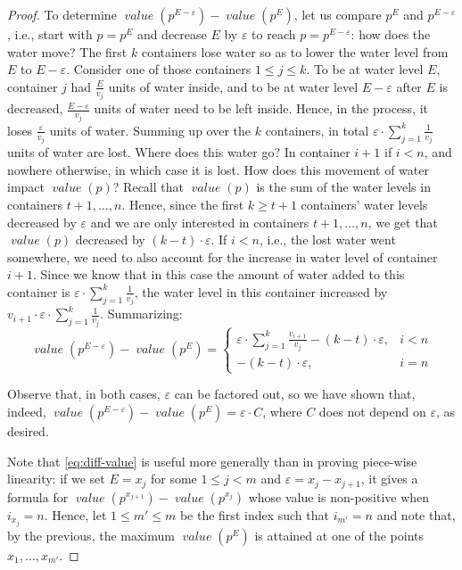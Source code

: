 \documentclass[sigconf,nonacm]{aamas}
\DeclareMathOperator{\valueText}{\textit{value}}
\newcommand{\val}[1]{\valueText({#1})}
\begin{document}
\begin{proof}
To determine $\val{p^{E - \varepsilon}} - \val{p^E}$, let us compare $p^E$ and $p^{E - \varepsilon}$, i.e., start with $p = p^E$ and decrease $E$ by $\varepsilon$ to reach $p = p^{E - \varepsilon}$: how does the water move? The first $k$ containers lose water so as to lower the water level from $E$ to $E - \varepsilon$. Consider one of those containers $1 \leq j \leq k$. To be at water level $E$, container $j$ had $\frac{E}{v_j}$ units of water inside, and to be at water level $E - \varepsilon$ after $E$ is decreased, $\frac{E - \varepsilon}{v_j}$ units of water need to be left inside. Hence, in the process, it loses $\frac{\varepsilon}{v_j}$ units of water. Summing up over the $k$ containers, in total $\varepsilon \cdot \sum_{j = 1}^{k}\frac{1}{v_j}$ units of water are lost. Where does this water go? In container $i + 1$ if $i < n$, and nowhere otherwise, in which case it is lost. How does this movement of water impact $\val{p}$? Recall that $\val{p}$ is the sum of the water levels in containers $t + 1, \dots, n$. Hence, since the first $k \geq t + 1$ containers' water levels decreased by $\varepsilon$ and we are only interested in containers $t + 1, \dots, n$, we get that $\val{p}$ decreased by $(k - t) \cdot \varepsilon$. If $i < n$, i.e., the lost water went somewhere, we need to also account for the increase in water level of container $i + 1$. Since we know that in this case the amount of water added to this container is $\varepsilon\cdot\sum_{j = 1}^{k}\frac{1}{v_j}$, the water level in this container increased by $v_{i + 1} \cdot \varepsilon \cdot \sum_{j = 1}^{k}\frac{1}{v_j}$. Summarizing:%
%
\begin{equation}\label{eq:diff-value}
    \val{p^{E - \varepsilon}} - \val{p^E} = \left\{
    \begin{array}{ll}
           \varepsilon \cdot \sum_{j = 1}^{k}\frac{v_{i + 1}}{v_j} - (k - t) \cdot \varepsilon, & i < n \\
           - (k - t) \cdot \varepsilon, & i = n 
    \end{array}
    \right.
\end{equation}

Observe that, in both cases, $\varepsilon$ can be factored out, so we have shown that, indeed, $\val{p^{E - \varepsilon}} - \val{p^E} = \varepsilon \cdot C$, where $C$ does not depend on $\varepsilon$, as desired. 

Note that \cref{eq:diff-value} is useful more generally than in proving piece-wise linearity: if we set $E = x_j$ for some $1 \leq j < m$ and $\varepsilon = x_j - x_{j + 1}$, it gives a formula for $\val{p^{x_{j + 1}}} - \val{p^{x_j}}$ whose value is non-positive when $i_{x_j} = n$. Hence, let $1 \leq m' \leq m$ be the first index such that $i_{m'} = n$ and note that, by the previous, the maximum $\val{p^E}$ is attained at one of the points $x_1, \dots, x_{m'}$. 


\end{proof}
\end{document}
